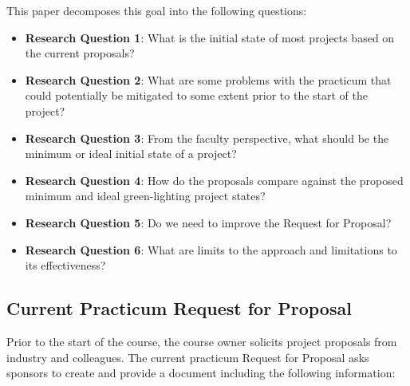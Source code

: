 This paper decomposes this goal into the following questions:


\begin{itemize}
\itemsep1pt\parskip0pt
\item
  \textbf{Research Question 1}: What is the initial state of most projects
  based on the current proposals?
\item
  \textbf{Research Question 2}: What are some problems with the practicum that could potentially be mitigated to some extent prior to the start of the project?
\item
  \textbf{Research Question 3}: From the faculty perspective, what should be
  the minimum or ideal initial state of a project?
\item
  \textbf{Research Question 4}: How do the proposals compare against the
  proposed minimum and ideal green-lighting project states?
\item
  \textbf{Research Question 5}: Do we need to improve the Request for
  Proposal?
\item
  \textbf{Research Question 6}: What are limits to the approach and
  limitations to its effectiveness?
\end{itemize}


\subsection{Current Practicum Request for Proposal}
\label{ProposalQuestions}

Prior to the start of the course, the course owner solicits project
proposals from industry and colleagues. The current practicum Request
for Proposal asks sponsors to create and provide a document including
the following information:

